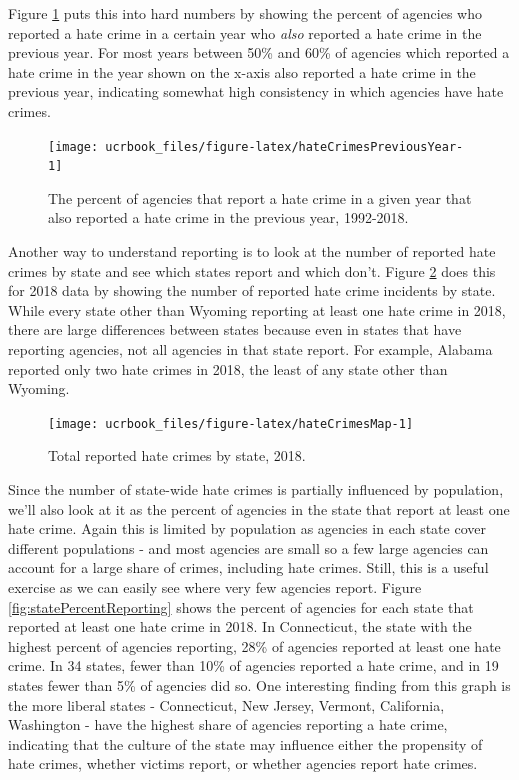 \documentclass[
  12pt,
  openany]{book}
\begin{document}
Figure \ref{fig:hateCrimesPreviousYear} puts this into hard numbers by showing the percent of agencies who reported a hate crime in a certain year who \emph{also} reported a hate crime in the previous year. For most years between 50\% and 60\% of agencies which reported a hate crime in the year shown on the x-axis also reported a hate crime in the previous year, indicating somewhat high consistency in which agencies have hate crimes.

\begin{figure}

{\centering \texttt{[image: ucrbook\_files/figure-latex/hateCrimesPreviousYear-1]} 

}

\caption{The percent of agencies that report a hate crime in a given year that also reported a hate crime in the previous year, 1992-2018.}\label{fig:hateCrimesPreviousYear}
\end{figure}

Another way to understand reporting is to look at the number of reported hate crimes by state and see which states report and which don't. Figure \ref{fig:hateCrimesMap} does this for 2018 data by showing the number of reported hate crime incidents by state. While every state other than Wyoming reporting at least one hate crime in 2018, there are large differences between states because even in states that have reporting agencies, not all agencies in that state report. For example, Alabama reported only two hate crimes in 2018, the least of any state other than Wyoming.

\begin{figure}

{\centering \texttt{[image: ucrbook\_files/figure-latex/hateCrimesMap-1]} 

}

\caption{Total reported hate crimes by state, 2018.}\label{fig:hateCrimesMap}
\end{figure}

Since the number of state-wide hate crimes is partially influenced by population, we'll also look at it as the percent of agencies in the state that report at least one hate crime. Again this is limited by population as agencies in each state cover different populations - and most agencies are small so a few large agencies can account for a large share of crimes, including hate crimes. Still, this is a useful exercise as we can easily see where very few agencies report. Figure \ref{fig:statePercentReporting} shows the percent of agencies for each state that reported at least one hate crime in 2018. In Connecticut, the state with the highest percent of agencies reporting, 28\% of agencies reported at least one hate crime. In 34 states, fewer than 10\% of agencies reported a hate crime, and in 19 states fewer than 5\% of agencies did so. One interesting finding from this graph is the more liberal states - Connecticut, New Jersey, Vermont, California, Washington - have the highest share of agencies reporting a hate crime, indicating that the culture of the state may influence either the propensity of hate crimes, whether victims report, or whether agencies report hate crimes.
\end{document}
